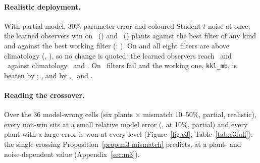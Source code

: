 \paragraph{Realistic deployment.} With partial model, 30\% parameter error and coloured Student-$t$ noise at once, the learned observers win on \CthreeRealisticIdVsWorking\ () and \CthreeRealisticSeqVsWorking\ () plants against the best filter of any kind and against the best working filter (: \OutcomeCThreeRealistic). On  and  all eight filters are above climatology (\CthreeRealisticSeqBioreactorFailedFilters, \CthreeRealisticSeqQuadTankFailedFilters), so no change is quoted: the learned observers reach \CthreeRealisticSeqBioreactorBestLearned\ and \CthreeRealisticSeqQuadTankBestLearned\ against climatology \CthreeRealisticSeqBioreactorClimatology\ and \CthreeRealisticSeqQuadTankClimatology. On  \CthreeRealisticSeqLorenzFailedFilters\ filters fail and the working one, \texttt{kkl\_mb}, is beaten by \CthreeRealisticSeqLorenzVsWorking; ,  and  by \CthreeRealisticSeqBatteryVsWorking, \CthreeRealisticSeqDuffingVsWorking\ and \CthreeRealisticSeqVdpVsWorking.

\paragraph{Reading the crossover.} Over the 36 model-wrong cells (six plants $\times$ mismatch 10--50\%, partial, realistic), every non-win sits at a small relative model error (,  at 10\%,  partial) and every plant with a large error is won at every level (Figure~\ref{fig:c3}, Table~\ref{tab:c3full}): the single crossing Proposition~\ref{prop:m3-mismatch} predicts, at a plant- and noise-dependent value (Appendix~\ref{sec:m3}).

